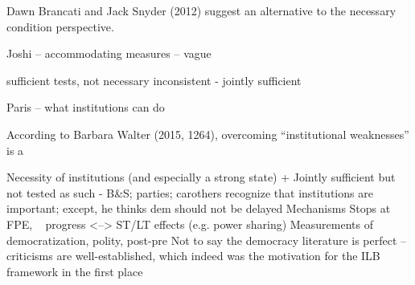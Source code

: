 \documentclass [11pt]{article}
\begin{document}
Dawn Brancati and Jack Snyder (2012) suggest an alternative to the necessary condition perspective.

Joshi -- accommodating measures -- vague


sufficient tests, not necessary
inconsistent - jointly sufficient

Paris -- what institutions can do


According to Barbara Walter (2015, 1264), overcoming ``institutional weaknesses'' is a 




Necessity of institutions (and especially a strong state) + Jointly sufficient but not tested as such - B&S; parties; 
carothers recognize that institutions are important; except, he thinks dem should not be delayed
Mechanisms
Stops at FPE, ~ progress <--> ST/LT effects (e.g. power sharing)
Measurements of democratization, polity, post-pre
Not to say the democracy literature is perfect -- criticisms are well-established, which indeed was the motivation for the ILB framework in the first place

\end{document}
